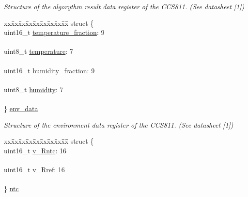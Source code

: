 \begin{DoxyCompactItemize}
\begin{tabbing}
\end{tabbing}\begin{DoxyCompactList}\small\item\em Structure of the algorythm result data register of the C\+C\+S811. (See datasheet \mbox{[}1\mbox{]}) \end{DoxyCompactList}\item 
\begin{tabbing}
xx\=xx\=xx\=xx\=xx\=xx\=xx\=xx\=xx\=\kill
struct \{\\
\>uint16\_t \mbox{\hyperlink{union_application_register_a369e24a68ff6c1f92b752677988145d9}{temperature\_fraction}}: 9\\
\>\\
\>uint8\_t \mbox{\hyperlink{union_application_register_ad8c21d94b1e5295e681983b7dd453eb8}{temperature}}: 7\\
\>\\
\>uint16\_t \mbox{\hyperlink{union_application_register_aef743be1f1c7224b4a275e825e4c4693}{humidity\_fraction}}: 9\\
\>\\
\>uint8\_t \mbox{\hyperlink{union_application_register_a3cb62182097ceb535c2f31919c98a0b6}{humidity}}: 7\\
\>\\
\} \mbox{\hyperlink{union_application_register_a521ae6a473252f47fc132cb0b54a8ae0}{env\_data}}\\

\end{tabbing}\begin{DoxyCompactList}\small\item\em Structure of the environment data register of the C\+C\+S811. (See datasheet \mbox{[}1\mbox{]}) \end{DoxyCompactList}\item 
\begin{tabbing}
xx\=xx\=xx\=xx\=xx\=xx\=xx\=xx\=xx\=\kill
struct \{\\
\>uint16\_t \mbox{\hyperlink{union_application_register_a3b5ca9a6349d352395207fa5d3ce857c}{v\_Rntc}}: 16\\
\>\\
\>uint16\_t \mbox{\hyperlink{union_application_register_ad05dd83b4bd4782a07617cae54d23b21}{v\_Rref}}: 16\\
\>\\
\} \mbox{\hyperlink{union_application_register_ae5d3cf16f820557739bab1976fc6dcc8}{ntc}}\\


\end{tabbing}
\end{DoxyCompactItemize}
